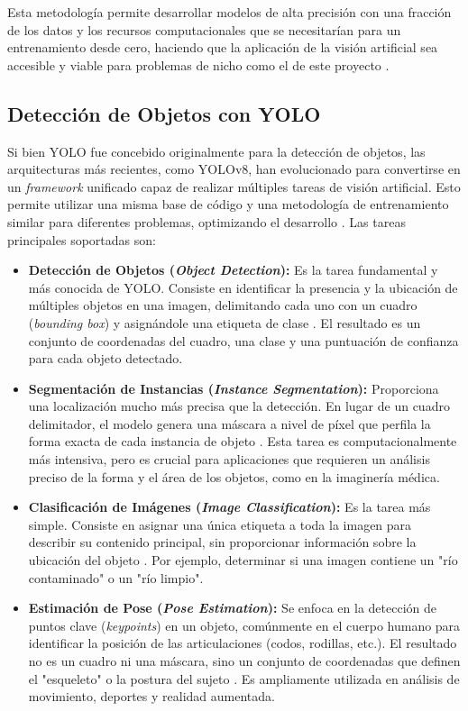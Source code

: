 Esta metodología permite desarrollar modelos de alta precisión con una fracción de los datos y los recursos computacionales que se necesitarían para un entrenamiento desde cero, haciendo que la aplicación de la visión artificial sea accesible y viable para problemas de nicho como el de este proyecto \cite{pan2009survey}.

\subsection{Detección de Objetos con YOLO}
\label{subsec:yolo}
Si bien YOLO fue concebido originalmente para la detección de objetos, las arquitecturas más recientes, como YOLOv8, han evolucionado para convertirse en un \textit{framework} unificado capaz de realizar múltiples tareas de visión artificial. Esto permite utilizar una misma base de código y una metodología de entrenamiento similar para diferentes problemas, optimizando el desarrollo \cite{ultralyticsYOLOv8}. Las tareas principales soportadas son:

\begin{itemize}
    \item \textbf{Detección de Objetos (\textit{Object Detection}):} Es la tarea fundamental y más conocida de YOLO. Consiste en identificar la presencia y la ubicación de múltiples objetos en una imagen, delimitando cada uno con un cuadro (\textit{bounding box}) y asignándole una etiqueta de clase \cite{terven2023yolo}. El resultado es un conjunto de coordenadas del cuadro, una clase y una puntuación de confianza para cada objeto detectado.

    \item \textbf{Segmentación de Instancias (\textit{Instance Segmentation}):} Proporciona una localización mucho más precisa que la detección. En lugar de un cuadro delimitador, el modelo genera una máscara a nivel de píxel que perfila la forma exacta de cada instancia de objeto \cite{ultralyticsYOLOv8}. Esta tarea es computacionalmente más intensiva, pero es crucial para aplicaciones que requieren un análisis preciso de la forma y el área de los objetos, como en la imaginería médica.

    \item \textbf{Clasificación de Imágenes (\textit{Image Classification}):} Es la tarea más simple. Consiste en asignar una única etiqueta a toda la imagen para describir su contenido principal, sin proporcionar información sobre la ubicación del objeto \cite{sapkota2025yolo}. Por ejemplo, determinar si una imagen contiene un "río contaminado" o un "río limpio".

    \item \textbf{Estimación de Pose (\textit{Pose Estimation}):} Se enfoca en la detección de puntos clave (\textit{keypoints}) en un objeto, comúnmente en el cuerpo humano para identificar la posición de las articulaciones (codos, rodillas, etc.). El resultado no es un cuadro ni una máscara, sino un conjunto de coordenadas que definen el "esqueleto" o la postura del sujeto \cite{ultralyticsYOLOv8}. Es ampliamente utilizada en análisis de movimiento, deportes y realidad aumentada.
\end{itemize}

